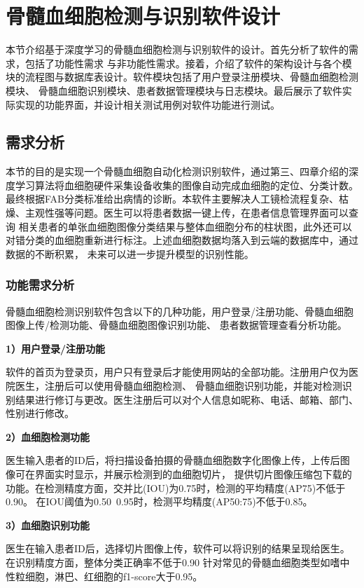 \chapter{骨髓血细胞检测与识别软件设计}
本节介绍基于深度学习的骨髓血细胞检测与识别软件的设计。首先分析了软件的需求，包括了功能性需求
与非功能性需求。接着，介绍了软件的架构设计与各个模块的流程图与数据库表设计。软件模块包括了用户登录注册模块、骨髓血细胞检测模块、
骨髓血细胞识别模块、患者数据管理模块与日志模块。最后展示了软件实际实现的功能界面，并设计相关测试用例对软件功能进行测试。


\section{需求分析}
本节的目的是实现一个骨髓血细胞自动化检测识别软件，通过第三、四章介绍的深度学习算法将血细胞硬件采集设备收集的图像自动完成血细胞的定位、分类计数。
最终根据FAB分类标准给出病情的诊断。本软件主要解决人工镜检流程复杂、枯燥、主观性强等问题。医生可以将患者数据一键上传，在患者信息管理界面可以查询
相关患者的单张血细胞图像分类结果与整体血细胞分布的柱状图，此外还可以对错分类的血细胞重新进行标注。上述血细胞数据均落入到云端的数据库中，通过数据的不断积累，
未来可以进一步提升模型的识别性能。

\subsection{功能需求分析}
骨髓血细胞检测识别软件包含以下的几种功能，用户登录/注册功能、骨髓血细胞图像上传/检测功能、骨髓血细胞图像识别功能、
患者数据管理查看分析功能。

\textbf{1）用户登录/注册功能}

软件的首页为登录页，用户只有登录后才能使用网站的全部功能。注册用户仅为医院医生，注册后可以使用骨髓血细胞检测、
骨髓血细胞识别功能，并能对检测识别结果进行修订与更改。医生注册后可以对个人信息如昵称、电话、邮箱、部门、性别进行修改。

\textbf{2）血细胞检测功能}

医生输入患者的ID后，将扫描设备拍摄的骨髓血细胞数字化图像上传，上传后图像可在界面实时显示，并展示检测到的血细胞切片，
提供切片图像压缩包下载的功能。在检测精度方面，交并比(IOU)为0.75时，检测的平均精度(AP75)不低于0.90。
在IOU阈值为0.50~0.95时，检测平均精度(AP50:75)不低于0.85。


\textbf{3）血细胞识别功能}

医生在输入患者ID后，选择切片图像上传，软件可以将识别的结果呈现给医生。在识别精度方面，整体分类正确率不低于0.90
针对常见的骨髓血细胞类型如嗜中性粒细胞，淋巴、红细胞的f1-score大于0.95。

